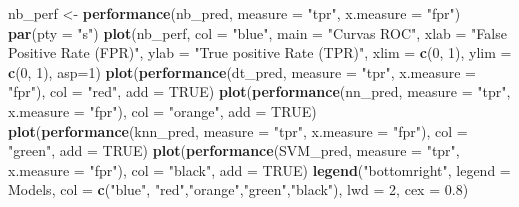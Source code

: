 \documentclass[
]{article}
\newenvironment{Shaded}{\begin{snugshade}}{\end{snugshade}}
\newcommand{\AttributeTok}[1]{\textcolor[rgb]{0.13,0.29,0.53}{#1}}
\newcommand{\ConstantTok}[1]{\textcolor[rgb]{0.56,0.35,0.01}{#1}}
\newcommand{\DecValTok}[1]{\textcolor[rgb]{0.00,0.00,0.81}{#1}}
\newcommand{\FloatTok}[1]{\textcolor[rgb]{0.00,0.00,0.81}{#1}}
\newcommand{\FunctionTok}[1]{\textcolor[rgb]{0.13,0.29,0.53}{\textbf{#1}}}
\newcommand{\NormalTok}[1]{#1}
\newcommand{\OtherTok}[1]{\textcolor[rgb]{0.56,0.35,0.01}{#1}}
\newcommand{\StringTok}[1]{\textcolor[rgb]{0.31,0.60,0.02}{#1}}
\begin{document}
\begin{Shaded}
\begin{Highlighting}[]
\NormalTok{  nb\_perf }\OtherTok{\textless{}{-}} \FunctionTok{performance}\NormalTok{(nb\_pred, }\AttributeTok{measure =} \StringTok{"tpr"}\NormalTok{, }\AttributeTok{x.measure =} \StringTok{"fpr"}\NormalTok{)}
  \FunctionTok{par}\NormalTok{(}\AttributeTok{pty =} \StringTok{"s"}\NormalTok{)}
  \FunctionTok{plot}\NormalTok{(nb\_perf, }\AttributeTok{col =} \StringTok{"blue"}\NormalTok{, }\AttributeTok{main =} \StringTok{"Curvas ROC"}\NormalTok{, }\AttributeTok{xlab =} \StringTok{"False Positive Rate (FPR)"}\NormalTok{,}
       \AttributeTok{ylab =} \StringTok{"True positive Rate (TPR)"}\NormalTok{, }\AttributeTok{xlim =} \FunctionTok{c}\NormalTok{(}\DecValTok{0}\NormalTok{, }\DecValTok{1}\NormalTok{), }\AttributeTok{ylim =} \FunctionTok{c}\NormalTok{(}\DecValTok{0}\NormalTok{, }\DecValTok{1}\NormalTok{), }\AttributeTok{asp=}\DecValTok{1}\NormalTok{)}
  \FunctionTok{plot}\NormalTok{(}\FunctionTok{performance}\NormalTok{(dt\_pred, }\AttributeTok{measure =} \StringTok{"tpr"}\NormalTok{, }\AttributeTok{x.measure =} \StringTok{"fpr"}\NormalTok{), }\AttributeTok{col =} \StringTok{"red"}\NormalTok{, }\AttributeTok{add =} \ConstantTok{TRUE}\NormalTok{)}
  \FunctionTok{plot}\NormalTok{(}\FunctionTok{performance}\NormalTok{(nn\_pred, }\AttributeTok{measure =} \StringTok{"tpr"}\NormalTok{, }\AttributeTok{x.measure =} \StringTok{"fpr"}\NormalTok{), }\AttributeTok{col =} \StringTok{"orange"}\NormalTok{, }\AttributeTok{add =} \ConstantTok{TRUE}\NormalTok{)}
  \FunctionTok{plot}\NormalTok{(}\FunctionTok{performance}\NormalTok{(knn\_pred, }\AttributeTok{measure =} \StringTok{"tpr"}\NormalTok{, }\AttributeTok{x.measure =} \StringTok{"fpr"}\NormalTok{), }\AttributeTok{col =} \StringTok{"green"}\NormalTok{, }\AttributeTok{add =} \ConstantTok{TRUE}\NormalTok{)}
  \FunctionTok{plot}\NormalTok{(}\FunctionTok{performance}\NormalTok{(SVM\_pred, }\AttributeTok{measure =} \StringTok{"tpr"}\NormalTok{, }\AttributeTok{x.measure =} \StringTok{"fpr"}\NormalTok{), }\AttributeTok{col =} \StringTok{"black"}\NormalTok{, }\AttributeTok{add =} \ConstantTok{TRUE}\NormalTok{)}
  \FunctionTok{legend}\NormalTok{(}\StringTok{"bottomright"}\NormalTok{, }\AttributeTok{legend =}\NormalTok{ Models, }\AttributeTok{col =} \FunctionTok{c}\NormalTok{(}\StringTok{"blue"}\NormalTok{, }\StringTok{"red"}\NormalTok{,}\StringTok{"orange"}\NormalTok{,}\StringTok{"green"}\NormalTok{,}\StringTok{"black"}\NormalTok{), }\AttributeTok{lwd =} \DecValTok{2}\NormalTok{, }\AttributeTok{cex =} \FloatTok{0.8}\NormalTok{)}
\end{Highlighting}
\end{Shaded}
\end{document}
